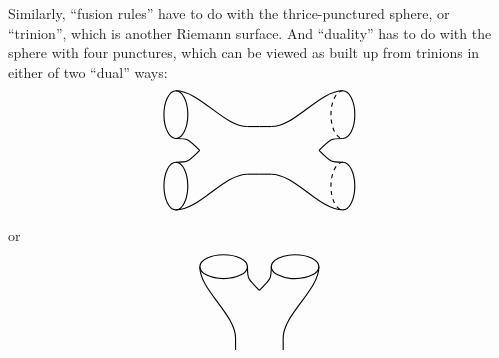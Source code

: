 \documentclass{article}
\begin{document}
\begin{enumerate}
  Similarly, ``fusion rules'' have to do with the thrice-punctured
  sphere, or ``trinion'', which is another Riemann surface. And
  ``duality'' has to do with the sphere with four punctures, which can
  be viewed as built up from trinions in either of two ``dual'' ways: \[
     \begin{tikzpicture}[scale=0.3,rotate=90]
       \begin{scope}
         \draw[thick] (-3,0) ellipse (2cm and 1cm);
         \draw[thick] (3,0) ellipse (2cm and 1cm);
         \draw[thick] (-5,0) .. controls (-5,-2) and (-2,-4) .. (-2,-6);
         \draw[thick] (5,0) .. controls (5,-2) and (2,-4) .. (2,-6);
         \draw[thick] (-1,0) .. controls (-1,-1) .. (0,-2);
         \draw[thick] (1,0) .. controls (1,-1) .. (0,-2);
         \draw[thick] (-2,-6) to (-2,-7);
         \draw[thick] (2,-6) to (2,-7);
       \end{scope}
       \begin{scope}[rotate=180,shift={(0,14)}]
         \begin{scope}[shift={(-3,0)},rotate=180]
           \draw[thick,dashed] (0:2) arc (0:180:2cm and 1cm);
           \draw[thick] (180:2) arc (180:360:2cm and 1cm);
         \end{scope}
         \begin{scope}[shift={(3,0)},rotate=180]
           \draw[thick,dashed] (0:2) arc (0:180:2cm and 1cm);
           \draw[thick] (180:2) arc (180:360:2cm and 1cm);
         \end{scope}
         \draw[thick] (-5,0) .. controls (-5,-2) and (-2,-4) .. (-2,-6);
         \draw[thick] (5,0) .. controls (5,-2) and (2,-4) .. (2,-6);
         \draw[thick] (-1,0) .. controls (-1,-1) .. (0,-2);
         \draw[thick] (1,0) .. controls (1,-1) .. (0,-2);
         \draw[thick] (-2,-6) to (-2,-7);
         \draw[thick] (2,-6) to (2,-7);
       \end{scope}
     \end{tikzpicture}
   \] or \[
     \begin{tikzpicture}[scale=0.3]
       \begin{scope}
         \draw[thick] (-3,0) ellipse (2cm and 1cm);
         \draw[thick] (3,0) ellipse (2cm and 1cm);
         \draw[thick] (-5,0) .. controls (-5,-2) and (-2,-4) .. (-2,-6);
         \draw[thick] (5,0) .. controls (5,-2) and (2,-4) .. (2,-6);
         \draw[thick] (-1,0) .. controls (-1,-1) .. (0,-2);
         \draw[thick] (1,0) .. controls (1,-1) .. (0,-2);
         \draw[thick] (-2,-6) to (-2,-7);
         \draw[thick] (2,-6) to (2,-7);

\end{scope}
\end{tikzpicture}\]
\end{enumerate}
\end{document}
